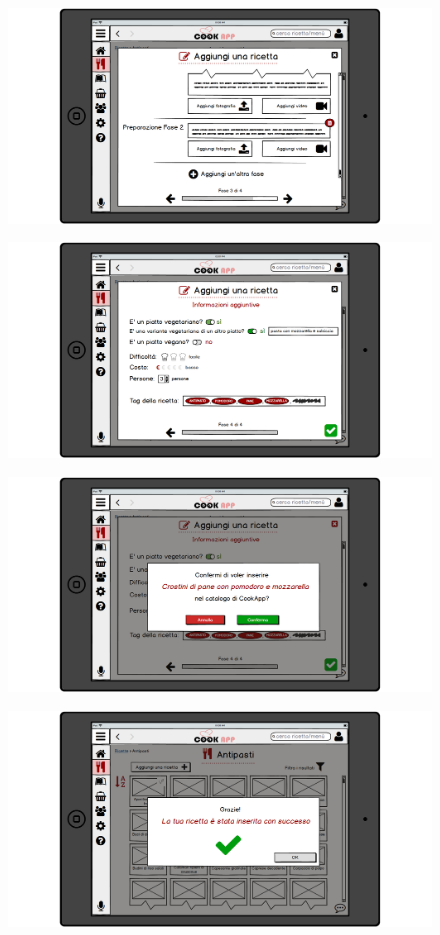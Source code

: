 \begin{figure}[H]
	\centering
	\includegraphics[width=0.95\linewidth]{img/mockup/Aggiungi-ricetta5.png}
\end{figure}
\begin{figure}[H]
	\centering
	\includegraphics[width=0.95\linewidth]{img/mockup/Aggiungi-ricetta6.png}
\end{figure}
\begin{figure}[H]
	\centering
	\includegraphics[width=0.95\linewidth]{img/mockup/Aggiungi-ricetta7.png}
\end{figure}
\begin{figure}[H]
	\centering
	\includegraphics[width=0.95\linewidth]{img/mockup/Aggiungi-ricetta8.png}
\end{figure}
